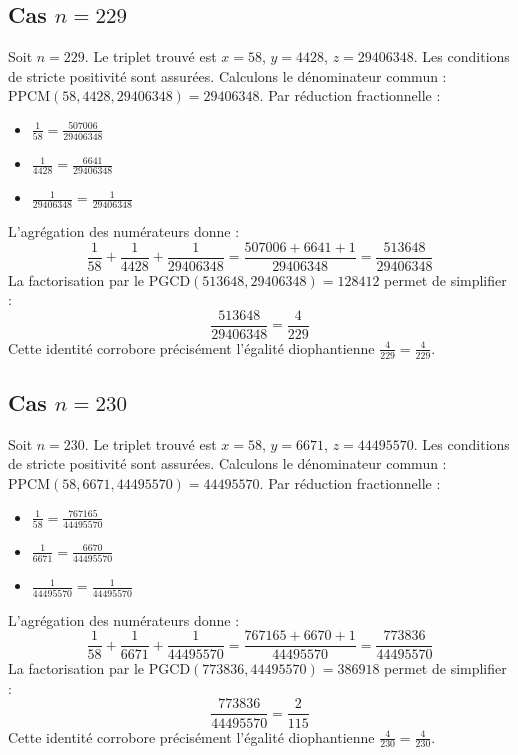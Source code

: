 \documentclass[11pt,a4paper]{article}
\begin{document}
\subsection{Cas $n = 229$}
Soit $n = 229$. Le triplet trouvé est $x = 58$, $y = 4428$, $z = 29406348$.
Les conditions de stricte positivité sont assurées.
Calculons le dénominateur commun : $\text{PPCM}(58, 4428, 29406348) = 29406348$.
Par réduction fractionnelle :
\begin{itemize}
    \item $\frac{1}{58} = \frac{507006}{29406348}$
    \item $\frac{1}{4428} = \frac{6641}{29406348}$
    \item $\frac{1}{29406348} = \frac{1}{29406348}$
\end{itemize}
L'agrégation des numérateurs donne :
$$ \frac{1}{58} + \frac{1}{4428} + \frac{1}{29406348} = \frac{507006 + 6641 + 1}{29406348} = \frac{513648}{29406348} $$
La factorisation par le $\text{PGCD}(513648, 29406348) = 128412$ permet de simplifier :
$$ \frac{513648}{29406348} = \frac{4}{229} $$
Cette identité corrobore précisément l'égalité diophantienne $\frac{4}{229} = \frac{4}{229}$.

\subsection{Cas $n = 230$}
Soit $n = 230$. Le triplet trouvé est $x = 58$, $y = 6671$, $z = 44495570$.
Les conditions de stricte positivité sont assurées.
Calculons le dénominateur commun : $\text{PPCM}(58, 6671, 44495570) = 44495570$.
Par réduction fractionnelle :
\begin{itemize}
    \item $\frac{1}{58} = \frac{767165}{44495570}$
    \item $\frac{1}{6671} = \frac{6670}{44495570}$
    \item $\frac{1}{44495570} = \frac{1}{44495570}$
\end{itemize}
L'agrégation des numérateurs donne :
$$ \frac{1}{58} + \frac{1}{6671} + \frac{1}{44495570} = \frac{767165 + 6670 + 1}{44495570} = \frac{773836}{44495570} $$
La factorisation par le $\text{PGCD}(773836, 44495570) = 386918$ permet de simplifier :
$$ \frac{773836}{44495570} = \frac{2}{115} $$
Cette identité corrobore précisément l'égalité diophantienne $\frac{4}{230} = \frac{4}{230}$.
\end{document}
